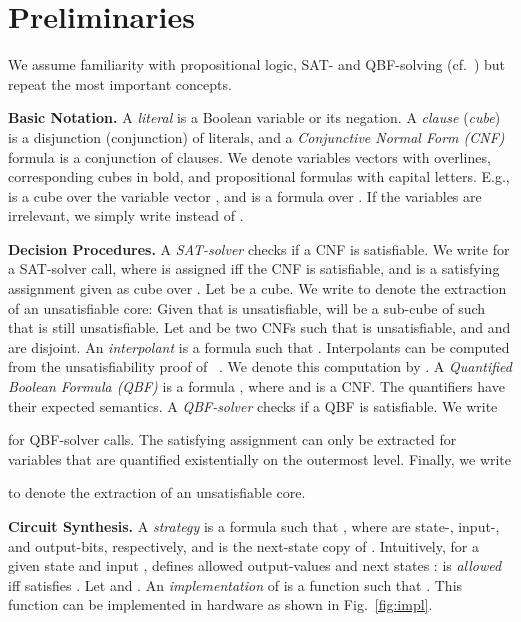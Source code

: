 \documentclass[conference]{IEEEtran}
\begin{document}
\section{Preliminaries} \label{sec:prel}

We assume familiarity with propositional logic, SAT- and QBF-solving 
(cf.~\cite{hos}) but repeat the most important concepts.

\textbf{Basic Notation.}
A \emph{literal} is a Boolean variable or its negation. A \emph{clause} 
(\emph{cube}) is a disjunction (conjunction) of literals, and a 
\emph{Conjunctive Normal Form (CNF)} formula is a conjunction of clauses.  We 
denote variables vectors with overlines, corresponding cubes in bold, and 
propositional formulas with capital letters. E.g.,  is a cube over 
the variable vector , and  is a 
formula over .  If the variables are irrelevant, we simply write 
 instead of .

\textbf{Decision Procedures.}
A \emph{SAT-solver} checks if a CNF is satisfiable.  We write  for a SAT-solver call, where 
 is assigned  iff the CNF  is satisfiable, and 
 is a satisfying assignment given as cube over .  Let 
 be a cube.  We write  to 
denote the extraction of an unsatisfiable core: Given that  
is unsatisfiable,  will be a sub-cube of  such that 
 is still unsatisfiable.  Let 
 and  be two CNFs 
such that  is unsatisfiable, and  and  
are disjoint.  An \emph{interpolant} is a formula  such that .  Interpolants can be computed from the 
unsatisfiability proof of ~\cite{DSilvaKPW10}.  We denote this 
computation by .
A \emph{Quantified Boolean Formula (QBF)} is a formula , where  and  is a CNF.  The quantifiers have their expected 
semantics.  A \emph{QBF-solver} checks if a QBF is satisfiable. We write

for QBF-solver calls.  The satisfying assignment  can only be 
extracted for variables that are quantified existentially on the outermost 
level. Finally, we write

to denote the extraction of an unsatisfiable core.

\textbf{Circuit Synthesis.}
A \emph{strategy} is a formula  such that , where 
 are state-, input-, and output-bits, 
respectively, and  is the next-state copy of . 
Intuitively, for a given state  and input ,  defines 
allowed output-values  and next states :  is \emph{allowed} iff  satisfies .  Let  and .  An 
\emph{implementation} of  is a function 
 such that .  This function can be 
implemented in hardware as shown in Fig.~\ref{fig:impl}.
\end{document}

